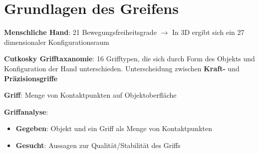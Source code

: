 \section{Grundlagen des Greifens}

\textbf{Menschliche Hand}: 21 Bewegungsfreiheitsgrade $\rightarrow$ In 3D ergibt sich ein 27 dimensionaler Konfigurationsraum

\textbf{Cutkosky Grifftaxanomie}: 16 Grifftypen, die sich durch Form des Objekts und Konfiguration der Hand unterschieden. Unterscheidung zwischen \textbf{Kraft-} und \textbf{Präzisionsgriffe}

\textbf{Griff}: Menge von Kontaktpunkten auf Objektoberfläche

\textbf{Griffanalyse}: 
\begin{itemize}
	\item \textbf{Gegeben}: Objekt und ein Griff als Menge von Kontaktpunkten
	\item \textbf{Gesucht}: Aussagen zur Qualität/Stabilität des Griffs
\end{itemize}
\pagebreak


